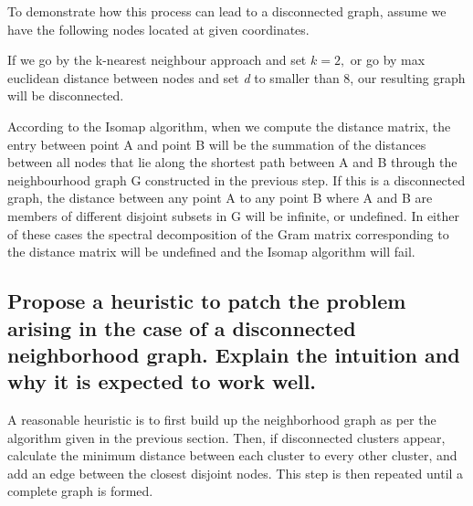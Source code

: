 \documentclass[11pt,a4paper,landscape]{article}
\begin{document}
To demonstrate how this process can lead to a disconnected graph,  assume we have the following nodes located at given coordinates.


If we go by the k-nearest neighbour approach and set $k=2,$ or go by max euclidean distance between nodes and set \textit{d} to smaller than 8, our resulting graph will be disconnected.


According to the Isomap algorithm, when we compute the distance matrix, the entry between point A and point B will be the summation of the distances between all nodes that lie along the shortest path between A and B through the neighbourhood graph G constructed in the previous step. If this is a disconnected graph, the distance between any point A to any point B where A and B are members of different disjoint subsets in G will be infinite, or undefined. In either of these cases the spectral decomposition of the Gram matrix corresponding to the distance matrix will be undefined and the Isomap algorithm will fail.

\subsection{Propose a heuristic to patch the problem arising in the case of a disconnected neighborhood graph. Explain the intuition and why it is expected to work well.}

A reasonable heuristic is to first build up the neighborhood graph as per the algorithm given in the previous section. Then, if disconnected clusters appear, calculate the minimum distance between each cluster to every other cluster,  and add an edge between the closest disjoint nodes. This step is then repeated until a complete graph is formed.\newline
\end{document}
